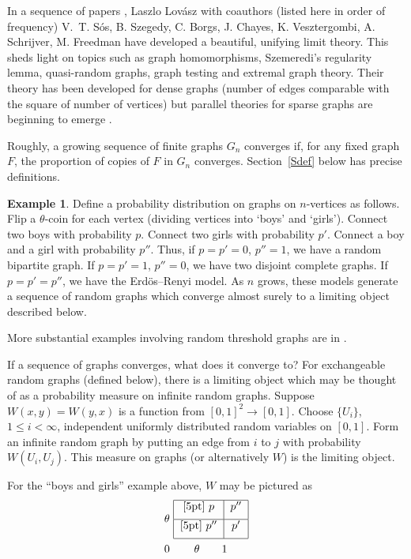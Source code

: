 \documentclass[11pt,reqno,tbtags]{amsart}
\numberwithin{equation}{section}
\theoremstyle{definition}
\newtheorem{example}[theorem]{Example}
\theoremstyle{remark}
\newcommand{\refS}[1]{Section~\ref{#1}}
\renewcommand{\=}{:=}
\newcommand{\Lovasz}{Lov\'asz}
\begin{document}
In a sequence of papers
\cite{BCL3,BCL2,BCL1,BCL1ii,Freed,LL2006,LL2007,LSos,LSzcont,LSzszem,LSztest,LSz},
Laszlo \Lovasz{} with coauthors (listed here in order
of frequency) V.~T. S\'os, B. Szegedy, C. Borgs, J. Chayes, K. Vesztergombi,
A. Schrijver, M. Freedman
have developed a beautiful, unifying
limit theory. This sheds light on topics such as graph
homomorphisms, Szemeredi's regularity lemma, quasi-random graphs,
graph testing and extremal graph theory. Their theory has been
developed for dense graphs (number of edges comparable with the square
of number of vertices) but parallel theories for sparse graphs are
beginning to emerge \cite{BR}.

Roughly, a growing sequence of finite graphs $G_n$ converges if, for
any fixed graph $F$, the proportion of copies of $F$ in $G_n$
converges. \refS{Sdef} below has precise definitions.

\begin{example}

Define a probability distribution on graphs on $n$-vertices as
follows. Flip a $\theta$-coin for each vertex (dividing vertices into
`boys' and `girls'). Connect two boys with probability $p$. Connect
two girls with probability $p'$. Connect a boy and a girl with
probability $p''$. Thus, if $p=p'=0$, $p''=1$, we have a random bipartite
graph. If $p=p'=1$, $p''=0$, we have two disjoint complete graphs. If
$p=p'=p''$, we have the Erd\"os--Renyi model. As $n$ grows, these models
generate a sequence of random graphs which converge almost surely to a
limiting object described below.

More substantial   
examples involving random threshold graphs are in \cite{threshold}. 

\end{example}

If a sequence of graphs converges, what does it converge to? For
exchangeable random graphs (defined below), there is a limiting object
which may be thought of as a probability measure on infinite random
graphs. Suppose $W(x,y) = W(y,x)$ is a function from $[0,1]^2 \to
[0,1]$. Choose $\{U_i \}$, $1 \leq i < \infty$, independent uniformly
distributed random variables on $[0,1]$. Form an infinite random graph
by putting an edge from $i$ to $j$ with probability $W(U_i,
U_j)$. This measure on graphs (or alternatively $W$) is the limiting
object.

For the ``boys and girls'' example above, $W$ may be pictured as
\medskip
\begin{align*}
\theta&\ \begin{tabular}{|c|c|}
\hline[5pt]
 $p$ &$p''$ \\
[5pt]\hline[5pt]
 $p''$ &$p'$ \\
[5pt]\hline
\end{tabular}\\ 
0& \hskip 22pt 
{\theta}
\hskip 20pt 
1
\end{align*} 
\end{document}
